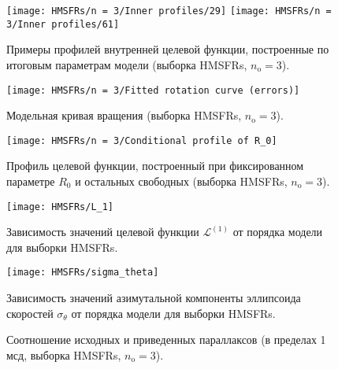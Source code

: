 \documentclass{beamer}
\begin{document}
\begin{frame}
\begin{figure}
  \centering
  \texttt{[image: HMSFRs/n = 3/Inner profiles/29]}
  \texttt{[image: HMSFRs/n = 3/Inner profiles/61]}
  \caption{Примеры профилей внутренней целевой функции, построенные по итоговым параметрам модели (выборка HMSFRs, $ n_\mathrm{o} = 3 $).}
\end{figure}
\end{frame}

\begin{frame}
\vspace{-0.6em}

\end{frame}

\begin{frame}
\begin{figure}
  \centering
  \texttt{[image: HMSFRs/n = 3/Fitted rotation curve (errors)]}
  \caption{Модельная кривая вращения (выборка HMSFRs, $ n_\mathrm{o} = 3 $).}
\end{figure}
\end{frame}

\begin{frame}
\begin{figure}
  \centering
  \texttt{[image: HMSFRs/n = 3/Conditional profile of R\_0]}
  \caption{Профиль целевой функции, построенный при фиксированном параметре $ R_0 $ и остальных свободных (выборка HMSFRs, $ n_\mathrm{o} = 3 $).}
\end{figure}
\end{frame}

\begin{frame}
\begin{figure}
  \centering
  \texttt{[image: HMSFRs/L\_1]}
  \caption{Зависимость значений целевой функции $ \mathcal{L}^{(1)} $ от порядка модели для выборки HMSFRs.}
\end{figure}
\end{frame}

\begin{frame}
\begin{figure}
  \centering
  \texttt{[image: HMSFRs/sigma\_theta]}
  \caption{Зависимость значений азимутальной компоненты эллипсоида скоростей $ \sigma_\theta $ от порядка модели для выборки HMSFRs.}
\end{figure}
\end{frame}

\begin{frame}
\begin{figure}
  \centering
  \subfloat{{\texttt{[image: HMSFRs/n = 3/Parallaxes (under 1 mas)]}}}
  \caption{Соотношение исходных и приведенных параллаксов (в пределах 1 мсд, выборка HMSFRs, $ n_\mathrm{o} = 3$).}
\end{figure}
\end{frame}
\end{document}
